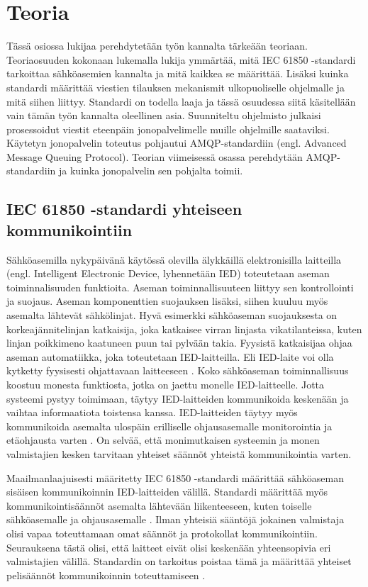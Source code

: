 \chapter{Teoria}
\label{ch:teoria}
Tässä osiossa lukijaa perehdytetään työn kannalta tärkeään teoriaan. Teoriaosuuden kokonaan lukemalla lukija ymmärtää, mitä IEC 61850 -standardi tarkoittaa sähköasemien kannalta ja mitä kaikkea se määrittää. Lisäksi kuinka standardi määrittää viestien tilauksen mekanismit ulkopuoliselle ohjelmalle ja mitä siihen liittyy. Standardi on todella laaja ja tässä osuudessa siitä käsitellään vain tämän työn kannalta oleellinen asia. Suunniteltu ohjelmisto julkaisi prosessoidut viestit eteenpäin jonopalvelimelle muille ohjelmille saataviksi. Käytetyn jonopalvelin toteutus pohjautui AMQP-standardiin (engl. Advanced Message Queuing Protocol). Teorian viimeisessä osassa perehdytään AMQP-standardiin ja kuinka jonopalvelin sen pohjalta toimii.


\section{IEC 61850 -standardi yhteiseen kommunikointiin}
Sähköasemilla nykypäivänä käytössä olevilla älykkäillä elektronisilla laitteilla (engl. Intelligent Electronic Device, lyhennetään IED) toteutetaan aseman toiminnalisuuden funktioita. Aseman toiminnallisuuteen liittyy sen kontrollointi ja suojaus. Aseman komponenttien suojauksen lisäksi, siihen kuuluu myös asemalta lähtevät sähkölinjat. Hyvä esimerkki sähköaseman suojauksesta on korkeajännitelinjan katkaisija, joka katkaisee virran linjasta vikatilanteissa, kuten linjan poikkimeno kaatuneen puun tai pylvään takia. Fyysistä katkaisijaa ohjaa aseman automatiikka, joka toteutetaan IED-laitteilla. Eli IED-laite voi olla kytketty fyysisesti ohjattavaan laitteeseen \cite[s.~63--64]{IEC61850-7-1}. Koko sähköaseman toiminnallisuus koostuu monesta funktiosta, jotka on jaettu monelle IED-laitteelle. Jotta systeemi pystyy toimimaan, täytyy IED-laitteiden kommunikoida keskenään ja vaihtaa informaatiota toistensa kanssa. IED-laitteiden täytyy myös kommunikoida asemalta ulospäin erilliselle ohjausasemalle monitorointia ja etäohjausta varten \cite[s.~1]{Brunner2008}. On selvää, että monimutkaisen systeemin ja monen valmistajien kesken tarvitaan yhteiset säännöt yhteistä kommunikointia varten.

Maailmanlaajuisesti määritetty IEC 61850 -standardi määrittää sähköaseman sisäisen kommunikoinnin IED-laitteiden välillä. Standardi määrittää myös kommunikointisäännöt asemalta lähtevään liikenteeseen, kuten toiselle sähköasemalle ja ohjausasemalle \cite[s.~10]{IEC61850-7-1}. Ilman yhteisiä sääntöjä jokainen valmistaja olisi vapaa toteuttamaan omat säännöt ja protokollat kommunikointiin. Seurauksena tästä olisi, että laitteet eivät olisi keskenään yhteensopivia eri valmistajien välillä. Standardin on tarkoitus poistaa tämä ja määrittää yhteiset pelisäännöt kommunikoinnin toteuttamiseen \cite[s.~1]{Kaneda2008}.

